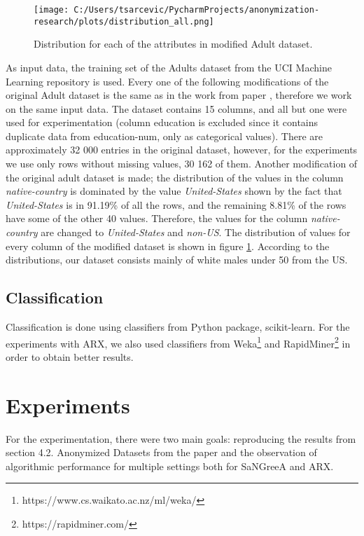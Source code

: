 \documentclass{article}
\begin{document}
\begin{figure}
	\texttt{[image: C:/Users/tsarcevic/PycharmProjects/anonymization-research/plots/distribution\_all.png]}
	\caption{Distribution for each of the attributes in modified Adult dataset.}
 	\label{fig:distribution}
\end{figure}

As input data, the training set of the Adults dataset from the UCI Machine Learning repository \cite{Dua:2017} is used. Every one of the following modifications of the original Adult dataset is the same as in the work from paper \cite{malle2017not}, therefore we work on the same input data. The dataset contains 15 columns, and all but one were used for experimentation (column education is excluded since it contains duplicate data from education-num, only as categorical values). There are approximately 32 000 entries in the original dataset, however, for the experiments we use only rows without missing values, 30 162 of them. Another modification of the original adult dataset is made; the distribution of the values in the column \textit{native-country} is dominated by the value \textit{United-States} shown by the fact that \textit{United-States} is in 91.19\% of all the rows, and the remaining 8.81\% of the rows have some of the other 40 values. Therefore, the values for the column \textit{native-country} are changed to \textit{United-States} and \textit{non-US}. The distribution of values for every column of the modified dataset is shown in figure \ref{fig:distribution}. According to the distributions, our dataset consists mainly of white males under 50 from the US. 

\subsection{Classification}
Classification is done using classifiers from Python package, scikit-learn. For the experiments with ARX, we also used classifiers from Weka\footnote{https://www.cs.waikato.ac.nz/ml/weka/} and RapidMiner\footnote{https://rapidminer.com/} in order to obtain better results.

\section{Experiments} \label{sec:experiments}
For the experimentation, there were two main goals: reproducing the results from section 4.2. Anonymized Datasets from the paper \cite{malle2017not} and the observation of algorithmic performance for multiple settings both for SaNGreeA and ARX. 
\end{document}
